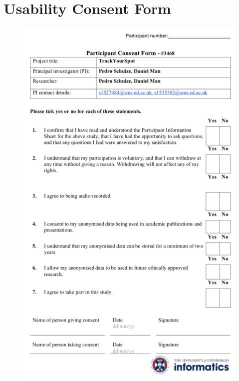 \chapter{Usability Consent Form}
\newpage
\begin{figure}[H]
    \includegraphics[width=1\textwidth, center]{figures/consentform.png}
\end{figure}

